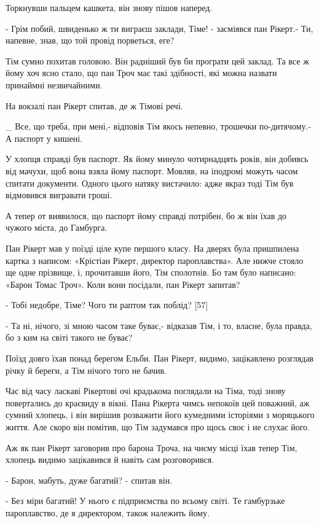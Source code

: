 Торкнувши пальцем кашкета, він знову пішов наперед.

- Грім побий, швиденько ж ти виграєш заклади, Тіме! - засміявся пан Рікерт.- Ти, напевне, знав, що той провід порветься, еге?

Тім сумно похитав головою. Він радніший був би програти цей заклад. Та все ж йому хоч ясно стало, що пан Троч має такі здібності, які можна назвати принаймні незвичайними.

На вокзалі пан Рікерт спитав, де ж Тімові речі.

_ Все, що треба, при мені,- відповів Тім якось непевно, трошечки по-дитячому.-А паспорт у кишені.

У хлопця справді був паспорт. Як йому минуло чотирнадцять років, він добивсь від мачухи, щоб вона взяла йому паспорт. Мовляв, на іподромі можуть часом спитати документи. Одного цього натяку вистачило: адже якраз тоді Тім був відмовився вигравати гроші.

А тепер от виявилося, що паспорт йому справді потрібен, бо ж він їхав до чужого міста, до Гамбурга.

Пан Рікерт мав у поїзді ціле купе першого класу. На дверях була пришпилена картка з написом: «Крістіан Рікерт, директор пароплавства». Але нижче стояло ще одне прізвище, і, прочитавши його, Тім сполотнів. Бо там було написано: «Барон Томас Троч». Коли вони посідали, пан Рікерт запитав?

- Тобі недобре, Тіме? Чого ти раптом так поблід? [57]

- Та ні, нічого, зі мною часом таке буває,- відказав Тім, і то, власне, була правда, бо з ким на світі такого не буває?

Поїзд довго їхав понад берегом Ельби. Пан Рікерт, видимо, зацікавлено розглядав річку й береги, а Тім нічого того не бачив.

Час від часу ласкаві Рікертові очі крадькома поглядали на Тіма, тоді знову повертались до краєвиду в вікні. Пана Рікерта чимсь непокоїв цей поважний, аж сумний хлопець, і він вирішив розважити його кумедними історіями з моряцького життя. Але скоро він помітив, що Тім задумався про щось своє і не слухає його.

Аж як пан Рікерт заговорив про барона Троча, на чиєму місці їхав тепер Тім, хлопець видимо зацікавився й навіть сам розговорився.

- Барон, мабуть, дуже багатий? - спитав він.

- Без міри багатий! У нього є підприємства по всьому світі. Те гамбурзьке пароплавство, де я директором, також належить йому.

